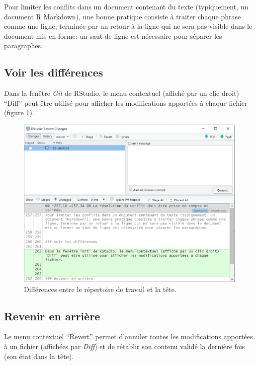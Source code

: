 \documentclass[
  11pt,
  french,
  a4paper,
  extrafontsizes,onecolumn,openright
  ]{memoir}
\begin{document}
Pour limiter les conflits dans un document contenant du texte (typiquement, un document R Markdown), une bonne pratique consiste à traiter chaque phrase comme une ligne, terminée par un retour à la ligne qui ne sera pas visible dans le document mis en forme: un saut de ligne est nécessaire pour séparer les paragraphes.

\hypertarget{voir-les-diffuxe9rences}{%
\subsection{Voir les différences}\label{voir-les-diffuxe9rences}}

Dans la fenêtre \emph{Git} de RStudio, le menu contextuel (affiché par un clic droit) ``Diff'' peut être utilisé pour afficher les modifications apportées à chaque fichier (figure \ref{fig:git-diff}).



\scriptsize

\begin{figure}

{\centering \includegraphics[width=0.8\linewidth]{images/git-diff} 

}

\caption{Différences entre le répertoire de travail et la tête.}\label{fig:git-diff}
\end{figure}

\normalsize

\hypertarget{revenir-en-arriuxe8re}{%
\subsection{Revenir en arrière}\label{revenir-en-arriuxe8re}}

Le menu contextuel ``Revert'' permet d'annuler toutes les modifications apportées à un fichier (affichées par \emph{Diff}) et de rétablir son contenu validé la dernière fois (son état dans la tête).
\end{document}
